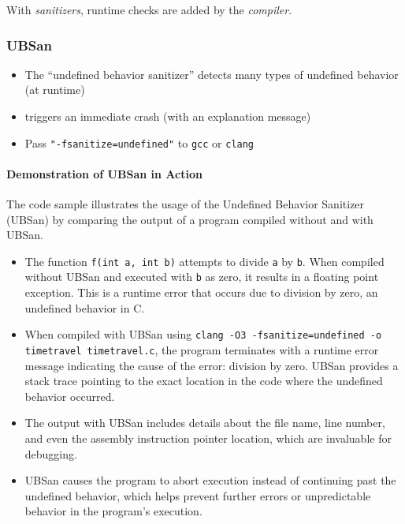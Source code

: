\documentclass[12pt]{article}
\begin{document}
With \emph{sanitizers}, runtime checks are added by the \emph{compiler}.
\subsubsection{UBSan}

\begin{itemize}
    \item The ``undefined behavior sanitizer'' detects many types of undefined behavior (at runtime)
    \item triggers an immediate crash (with an explanation message)
    \item Pass \texttt{"-fsanitize=undefined"} to \texttt{gcc} or \texttt{clang}
\end{itemize}

\paragraph{Demonstration of UBSan in Action}

The code sample illustrates the usage of the Undefined Behavior Sanitizer (UBSan) by comparing the output of a program compiled without and with UBSan.

\begin{itemize}
    \item The function \texttt{f(int a, int b)} attempts to divide \texttt{a} by \texttt{b}. When compiled without UBSan and executed with \texttt{b} as zero, it results in a floating point exception. This is a runtime error that occurs due to division by zero, an undefined behavior in C.
    
    \item When compiled with UBSan using \texttt{clang -O3 -fsanitize=undefined -o timetravel timetravel.c}, the program terminates with a runtime error message indicating the cause of the error: division by zero. UBSan provides a stack trace pointing to the exact location in the code where the undefined behavior occurred.
    
    \item The output with UBSan includes details about the file name, line number, and even the assembly instruction pointer location, which are invaluable for debugging.
    
    \item UBSan causes the program to abort execution instead of continuing past the undefined behavior, which helps prevent further errors or unpredictable behavior in the program's execution.
\end{itemize}
\end{document}
